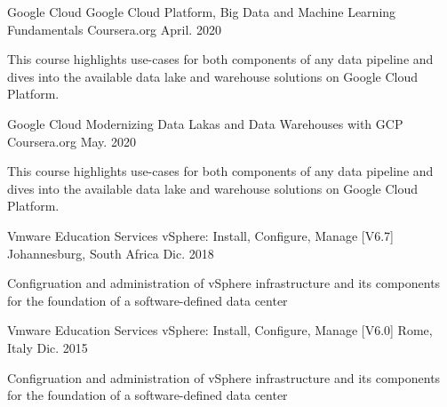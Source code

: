 


\begin{cventries}

	\cventry
	{Google Cloud} %
	{Google Cloud Platform, Big Data and Machine Learning Fundamentals} %
	{Coursera.org} %
	{April. 2020} %
	{ %
		\begin{cvitems}
			\item {This course highlights use-cases for both components of any data pipeline and dives into the available data lake and warehouse solutions on Google Cloud Platform.}
		\end{cvitems}
	}


	\cventry
	{Google Cloud} %
	{Modernizing Data Lakas and Data Warehouses with GCP} %
	{Coursera.org} %
	{May. 2020} %
	{ %
		\begin{cvitems}
			\item {This course highlights use-cases for both components of any data pipeline and dives into the available data lake and warehouse solutions on Google Cloud Platform.}
		\end{cvitems}
	}


	\cventry
	{Vmware Education Services} %
	{vSphere: Install, Configure, Manage [V6.7]} %
	{Johannesburg, South Africa} %
	{Dic. 2018} %
	{ %
		\begin{cvitems}
			\item {Configruation and administration of vSphere infrastructure and its components for the foundation of a software-defined data center}
		\end{cvitems}
	}


	\cventry
	{Vmware Education Services} %
	{vSphere: Install, Configure, Manage [V6.0]} %
	{Rome, Italy} %
	{Dic. 2015} %
	{ %
		\begin{cvitems}
			\item {Configruation and administration of vSphere infrastructure and its components for the foundation of a software-defined data center}
		\end{cvitems}
	}


\end{cventries}
